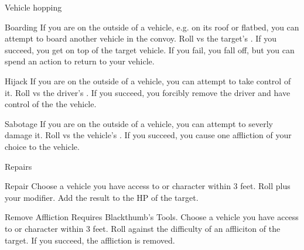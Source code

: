\begin{abstractsection}{Vehicle hopping}
\vspace{1ex}
\begin{describe}{Boarding}
  If you are on the outside of a vehicle, e.g. on its roof or flatbed, you can attempt to board another vehicle in the convoy. Roll  vs the target's . If you succeed, you get on top of the target vehicle. If you fail, you fall off, but you can spend an action to return to your vehicle.
\end{describe}

\begin{describe}{Hijack}
  If you are on the outside of a vehicle, you can attempt to take control of it. Roll  vs the driver's . If you succeed, you forcibly remove the driver and have control of the the vehicle.
\end{describe}

\begin{describe}{Sabotage}
  If you are on the outside of a vehicle, you can attempt to severly damage it. Roll  vs the vehicle's . If you succeed, you cause one affliction of your choice to the vehicle.
\end{describe}
\end{abstractsection}

\begin{abstractsection}{Repairs}
\vspace{1ex}

\begin{describe}{Repair}
  Choose a vehicle you have access to or character within 3 feet. Roll  plus  your  modifier. Add the result to the HP of the target.
\end{describe}

\begin{describe}{Remove Affliction}
  Requires Blackthumb's Tools. Choose a vehicle you have access to or character within 3 feet. Roll  against the difficulty of an affliciton of the target. If you succeed, the affliction is removed.
\end{describe}
\end{abstractsection}
